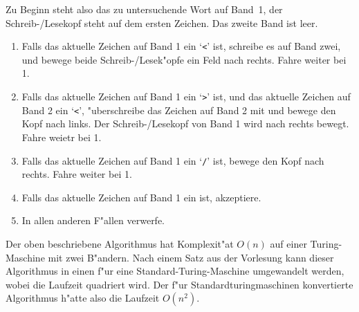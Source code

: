 \begin{loesung}
\begin{teilaufgaben}
Zu Beginn steht also das zu untersuchende Wort auf Band~1,
der Schreib-/Lesekopf steht auf dem ersten Zeichen.
Das zweite Band ist leer.
{
\renewcommand{\theenumii}{\arabic{enumii}}
\renewcommand{\labelenumii}{\theenumii.}
\begin{enumerate}
\item Falls das aktuelle Zeichen auf Band 1 ein `{\tt <}' ist,
schreibe es auf Band zwei, und bewege beide Schreib-/Lesek"opfe ein
Feld nach rechts. Fahre weiter bei 1.
\item Falls das aktuelle Zeichen auf Band 1 ein `{\tt >}' ist,
und das aktuelle Zeichen auf Band 2 ein `{\tt <}', "uberschreibe
das Zeichen auf Band 2 mit \textvisiblespace und bewege den Kopf
nach links. Der Schreib-/Lesekopf von Band 1 wird nach rechts bewegt.
Fahre weietr bei 1.
\item Falls das aktuelle Zeichen auf Band 1 ein `{\tt /}' ist, bewege
den Kopf nach rechts.
Fahre weiter bei 1.
\item Falls das aktuelle Zeichen auf Band 1 ein \textvisiblespace{} ist,
akzeptiere.
\item In allen anderen F"allen verwerfe.
\end{enumerate}
}
\item
Der oben beschriebene Algorithmus hat Komplexit"at $O(n)$ auf einer 
Turing-Maschine mit zwei B"andern. Nach einem Satz aus der Vorlesung
kann dieser Algorithmus in einen f"ur eine Standard-Turing-Maschine
umgewandelt werden, wobei die Laufzeit quadriert wird. Der f"ur 
Standardturingmaschinen konvertierte Algorithmus h"atte also die
Laufzeit $O(n^2)$.
\qedhere
\end{teilaufgaben}
\end{loesung}

